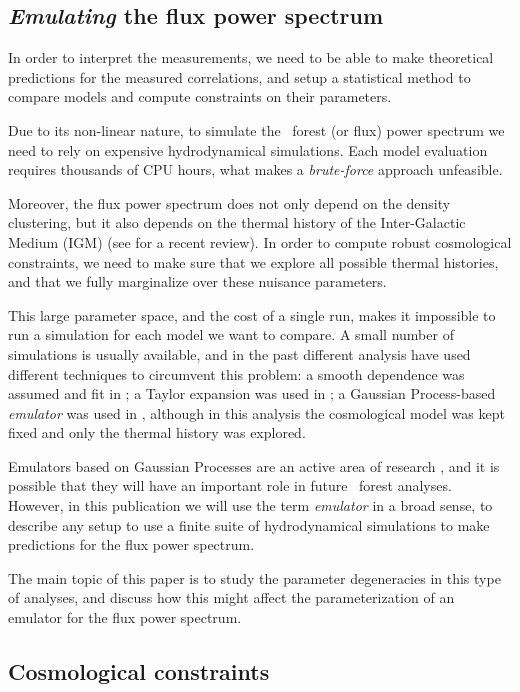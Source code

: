 \subsection{\textit{Emulating} the flux power spectrum}

In order to interpret the measurements, we need to be able to make 
theoretical predictions for the measured correlations, and setup a statistical 
method to compare models and compute constraints on their parameters.  

Due to its non-linear nature, to simulate the \lya\ forest (or flux) power 
spectrum we need to rely on expensive hydrodynamical simulations. 
Each model evaluation requires thousands of CPU hours, what makes a 
\textit{brute-force} approach unfeasible. 

Moreover, the flux power spectrum does not only depend on the density 
clustering, but it also depends on the thermal history of the 
Inter-Galactic Medium (IGM) (see \cite{Walther2018b} for a recent review).
In order to compute robust cosmological constraints, we need to make sure 
that we explore all possible thermal histories, and that we fully marginalize 
over these nuisance parameters.

This large parameter space, and the cost of a single run, makes it impossible 
to run a simulation for each model we want to compare.
A small number of simulations is usually available, and in the past different 
analysis have used different techniques to circumvent this problem: 
a smooth dependence was assumed and fit in \cite{McDonald2005a}; 
a Taylor expansion was used in \cite{Palanque-Delabrouille2013}; 
a Gaussian Process-based \textit{emulator} was used in 
\cite{Walther2018a,Walther2018b}, although in this analysis the cosmological
model was kept fixed and only the thermal history was explored.

Emulators based on Gaussian Processes are an active area of research 
, and it is possible that they will have an 
important role in future \lya\ forest analyses.
However, in this publication we will use the term \textit{emulator} in a broad
sense, to describe any setup to use a finite suite of hydrodynamical 
simulations to make predictions for the flux power spectrum.

The main topic of this paper is to study the parameter degeneracies in this 
type of analyses, and discuss how this might affect the parameterization of 
an emulator for the flux power spectrum.


\subsection{Cosmological constraints}

